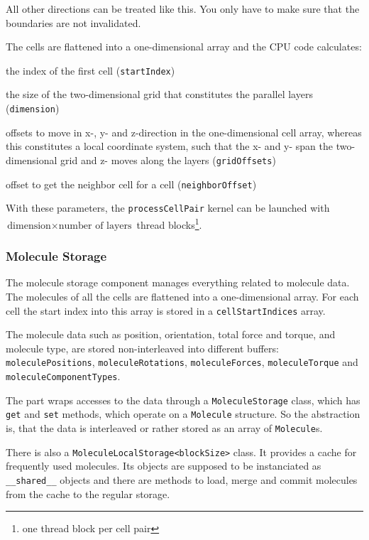 All other directions can be treated like this. You only have to make sure that the boundaries are not invalidated.

The cells are flattened into a one-dimensional array and the CPU code calculates:
\begin{compactitem}
\item the index of the first cell (\lstinline!startIndex!)
\item the size of the two-dimensional grid that constitutes the parallel layers (\lstinline!dimension!)
\item offsets to move in x-, y- and z-direction in the one-dimensional cell array, whereas this constitutes a local coordinate system, such that the x- and y- span the two-dimensional grid and z- moves along the layers (\lstinline!gridOffsets!)
\item offset to get the neighbor cell for a cell (\lstinline!neighborOffset!)
\end{compactitem}
With these parameters, the \lstinline!processCellPair! kernel can be launched with $ \text{dimension} \times     \text{number of layers} $ thread blocks\footnote{one thread block per cell pair}.

\subsubsection{Molecule Storage}
The molecule storage component manages everything related to molecule data. The molecules of all the cells are flattened into a one-dimensional array. For each cell the start index into this array is stored in a \lstinline!cellStartIndices! array. 

The molecule data such as position, orientation, total force and torque, and molecule type, are stored non-interleaved into different buffers: \lstinline!moleculePositions!, \lstinline!moleculeRotations!, \lstinline!moleculeForces!, \lstinline!moleculeTorque! and \lstinline!moleculeComponentTypes!.

The \cuda{} part wraps accesses to the data through a \lstinline!MoleculeStorage! class, which has \lstinline!get! and \lstinline!set! methods, which operate on a \lstinline!Molecule! structure. So the abstraction is, that the data is interleaved or rather stored as an array of \lstinline!Molecule!s.

There is also a \lstinline!MoleculeLocalStorage<blockSize>! class. It provides a cache for frequently used molecules. Its objects are supposed to be instanciated as \lstinline!__shared__! objects and there are methods to load, merge and commit molecules from the cache to the regular storage.

